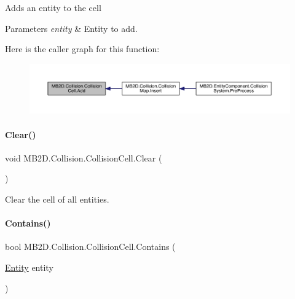 Adds an entity to the cell 


\begin{DoxyParams}{Parameters}
{\em entity} & Entity to add.\\
\hline
\end{DoxyParams}
Here is the caller graph for this function\+:
\nopagebreak
\begin{figure}[H]
\begin{center}
\leavevmode
\includegraphics[width=350pt]{class_m_b2_d_1_1_collision_1_1_collision_cell_a4fc338d7dbfd7418f5493424c5937213_icgraph}
\end{center}
\end{figure}
\hypertarget{class_m_b2_d_1_1_collision_1_1_collision_cell_ae4ff144f6c768003d8be46e17e130646}{}\label{class_m_b2_d_1_1_collision_1_1_collision_cell_ae4ff144f6c768003d8be46e17e130646} 
\paragraph{\texorpdfstring{Clear()}{Clear()}}
{\footnotesize\ttfamily void M\+B2\+D.\+Collision.\+Collision\+Cell.\+Clear (\begin{DoxyParamCaption}{ }\end{DoxyParamCaption})\hspace{0.3cm}{\ttfamily [inline]}}



Clear the cell of all entities. 

\hypertarget{class_m_b2_d_1_1_collision_1_1_collision_cell_aa4be244387541ee24d88da80331b3438}{}\label{class_m_b2_d_1_1_collision_1_1_collision_cell_aa4be244387541ee24d88da80331b3438} 
\paragraph{\texorpdfstring{Contains()}{Contains()}}
{\footnotesize\ttfamily bool M\+B2\+D.\+Collision.\+Collision\+Cell.\+Contains (\begin{DoxyParamCaption}\item[{\hyperlink{class_m_b2_d_1_1_entity_component_1_1_entity}{Entity}}]{entity }\end{DoxyParamCaption})\hspace{0.3cm}{\ttfamily [inline]}}



